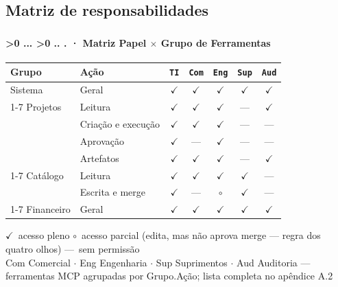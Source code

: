 \documentclass[aspectratio=169,10pt]{beamer}
\newcommand{\yes}{\textcolor{mlgreen}{$\checkmark$}}
\newcommand{\no}{\textcolor{mlred}{---}}
\newcommand{\half}{\textcolor{mlorange}{$\circ$}}
\newcommand{\role}[1]{\texttt{\small #1}}
\newcounter{mlc3}[subsection]
\newcounter{mlc4}[mlc3]
\newcommand{\pathnum}{%
  \ifnum\value{mlc4}>0
    \thesection.\thesubsection.\arabic{mlc3}.\arabic{mlc4}%
  \else\ifnum\value{mlc3}>0
    \thesection.\thesubsection.\arabic{mlc3}%
  \else
    \thesection.\thesubsection%
  \fi\fi
}
\newcommand{\mtitle}[1]{%
  \frametitle{\insertsection}%
  \framesubtitle{\pathnum\;·\; #1}}
\begin{document}
\subsection{Matriz de responsabilidades}
\begin{frame}
  \mtitle{Matriz Papel $\times$ Grupo de Ferramentas}
  \vspace{4pt}
  \setlength{\tabcolsep}{8pt}
  \renewcommand{\arraystretch}{1.35}
  \begin{tabularx}{\textwidth}{@{}l X c c c c c@{}}
    \hline
    \textbf{Grupo} & \textbf{Ação} & \role{TI} & \role{Com} & \role{Eng} & \role{Sup} & \role{Aud} \\
    \hline
    Sistema & Geral & \yes & \yes & \yes & \yes & \yes \\
    \cline{1-7}
    \textcolor{mlblue}{Projetos} & Leitura & \yes & \yes & \yes & \no & \yes \\
      & Criação e execução & \yes & \yes & \yes & \no & \no \\
      & Aprovação & \yes & \no & \yes & \no & \no \\
      & Artefatos & \yes & \yes & \yes & \no & \yes \\
    \cline{1-7}
    \textcolor{mlteal}{Catálogo} & Leitura & \yes & \yes & \yes & \yes & \no \\
      & Escrita e merge & \yes & \no & \half & \yes & \no \\
    \cline{1-7}
    Financeiro & Geral & \yes & \yes & \yes & \yes & \yes \\
    \hline
  \end{tabularx}
  \vspace{6pt}
  {\small \yes\ acesso pleno \quad \half\ acesso parcial (edita, mas não
  aprova merge --- regra dos quatro olhos) \quad \no\ sem permissão \\[2pt]
  Com Comercial $\cdot$ Eng Engenharia $\cdot$ Sup Suprimentos $\cdot$ Aud
  Auditoria \quad ---  ferramentas MCP agrupadas por Grupo.Ação;
  lista completa no apêndice A.2}
\end{frame}
\end{document}
